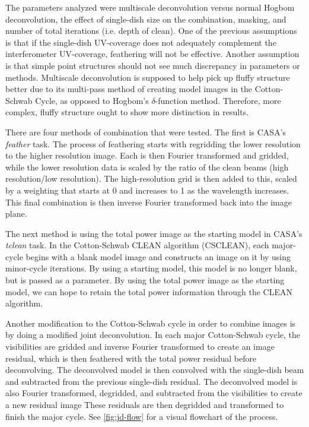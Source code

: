 \documentclass[preprint]{aastex63}
\begin{document}
The parameters analyzed were multiscale deconvolution versus normal Hogbom deconvolution, the effect of single-dish size on the combination, masking, and number of total iterations (i.e. depth of clean). One of the previous assumptions is that if the single-dish UV-coverage does not adequately complement the interferometer UV-coverage, feathering will not be effective. Another assumption is that simple point structures should not see much discrepancy in parameters or methods. Multiscale deconvolution is supposed to help pick up fluffy structure better due to its multi-pass method of creating model images in the Cotton-Schwab Cycle, as opposed to Hogbom's $\delta$-function method. Therefore, more complex, fluffy structure ought to show more distinction in results.

There are four methods of combination that were tested. The first is CASA's \textit{feather} task. The process of feathering starts with regridding the lower resolution to the higher resolution image. Each is then Fourier transformed and gridded, while the lower resolution data is scaled by the ratio of the clean beams (high resolution/low resolution). The high-resolution grid is then added to this, scaled by a weighting that starts at 0 and increases to 1 as the wavelength increases. This final combination is then inverse Fourier transformed back into the image plane. 

The next method is using the total power image as the starting model in CASA's \textit{tclean} task. In the Cotton-Schwab CLEAN algorithm (CSCLEAN), each major-cycle begins with a blank model image and constructs an image on it by using minor-cycle iterations. By using a starting model, this model is no longer blank, but is passed as a parameter. By using the total power image as the starting model, we can hope to retain the total power information through the CLEAN algorithm.

Another modification to the Cotton-Schwab cycle in order to combine images is by doing a modified joint deconvolution. In each major Cotton-Schwab cycle, the visibilities are gridded and inverse Fourier transformed to create an image residual, which is then feathered with the total power residual before deconvolving. The deconvolved model is then convolved with the single-dish beam and subtracted from the previous single-dish residual. The deconvolved model is also Fourier transformed, degridded, and subtracted from the visibilities to create a new residual image These residuals are then degridded and transformed to finish the major cycle. See \autoref{fig:jd-flow} for a visual flowchart of the process.
\end{document}
